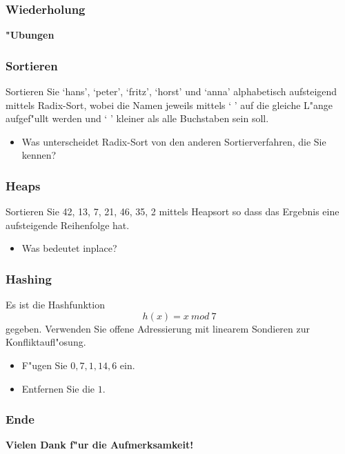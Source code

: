 \documentclass{beamer}
\begin{document}
\begin{frame}
\frametitle{Wiederholung}
\begin{center}
\textbf{\Huge "Ubungen}
\end{center}
\end{frame}


\begin{frame}
\frametitle{Sortieren}
\begin{exampleblock}{}
Sortieren Sie `hans', `peter', `fritz', `horst' und `anna' alphabetisch aufsteigend mittels Radix-Sort, wobei die Namen jeweils mittels ` ' auf die gleiche L"ange aufgef"ullt werden und ` ' kleiner als alle Buchstaben sein soll.

\pause

\begin{itemize}
\item Was unterscheidet Radix-Sort von den anderen Sortierverfahren, die Sie kennen?
\end{itemize}
\end{exampleblock}
\end{frame}


\begin{frame}
\frametitle{Heaps}
\begin{exampleblock}{}
Sortieren Sie 42, 13, 7, 21, 46, 35, 2 mittels Heapsort so dass das Ergebnis eine aufsteigende Reihenfolge hat.

\pause

\begin{itemize}
\item Was bedeutet inplace?
\end{itemize}
\end{exampleblock}
\end{frame}


\begin{frame}
\frametitle{Hashing}
\begin{exampleblock}{}
Es ist die Hashfunktion
$$h(x) = x\ mod\ 7$$
gegeben. Verwenden Sie offene Adressierung mit linearem Sondieren zur Konfliktaufl"osung.
\begin{itemize}
\item F"ugen Sie $0, 7, 1, 14, 6$ ein.
\item Entfernen Sie die $1$.
\end{itemize}
\end{exampleblock}
\end{frame}


\begin{frame}
\frametitle{Ende}
\begin{center}
\textbf{\Huge Vielen Dank f"ur die Aufmerksamkeit!}
\end{center}
\end{frame}
\end{document}

